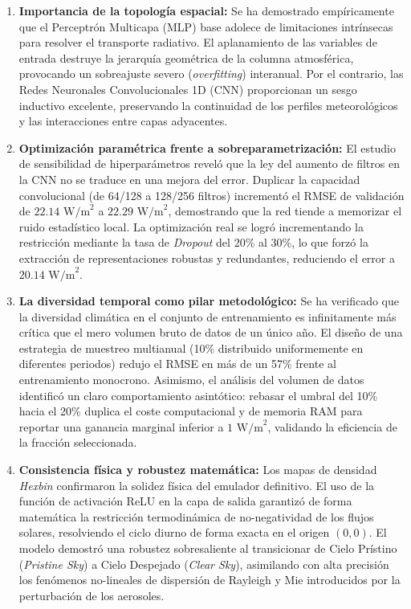 \documentclass[11pt,a4paper,twoside,pdf]{article}
\numberwithin{equation}{section}
\begin{document}
\begin{enumerate}
    \item \textbf{Importancia de la topología espacial:} Se ha demostrado empíricamente que el Perceptrón Multicapa (MLP) base adolece de limitaciones intrínsecas para resolver el transporte radiativo. El aplanamiento de las variables de entrada destruye la jerarquía geométrica de la columna atmosférica, provocando un sobreajuste severo (\textit{overfitting}) interanual. Por el contrario, las Redes Neuronales Convolucionales 1D (CNN) proporcionan un sesgo inductivo excelente, preservando la continuidad de los perfiles meteorológicos y las interacciones entre capas adyacentes.
    
    \item \textbf{Optimización paramétrica frente a sobreparametrización:} El estudio de sensibilidad de hiperparámetros reveló que la ley del aumento de filtros en la CNN no se traduce en una mejora del error. Duplicar la capacidad convolucional (de 64/128 a 128/256 filtros) incrementó el RMSE de validación de $22.14\text{ W/m}^2$ a $22.29\text{ W/m}^2$, demostrando que la red tiende a memorizar el ruido estadístico local. La optimización real se logró incrementando la restricción mediante la tasa de \textit{Dropout} del 20\% al 30\%, lo que forzó la extracción de representaciones robustas y redundantes, reduciendo el error a $20.14\text{ W/m}^2$.
    
    \item \textbf{La diversidad temporal como pilar metodológico:} Se ha verificado que la diversidad climática en el conjunto de entrenamiento es infinitamente más crítica que el mero volumen bruto de datos de un único año. El diseño de una estrategia de muestreo multianual (10\% distribuido uniformemente en diferentes periodos) redujo el RMSE en más de un 57\% frente al entrenamiento monocrono. Asimismo, el análisis del volumen de datos identificó un claro comportamiento asintótico: rebasar el umbral del 10\% hacia el 20\% duplica el coste computacional y de memoria RAM para reportar una ganancia marginal inferior a $1\text{ W/m}^2$, validando la eficiencia de la fracción seleccionada.
    
    \item \textbf{Consistencia física y robustez matemática:} Los mapas de densidad \textit{Hexbin} confirmaron la solidez física del emulador definitivo. El uso de la función de activación ReLU en la capa de salida garantizó de forma matemática la restricción termodinámica de no-negatividad de los flujos solares, resolviendo el ciclo diurno de forma exacta en el origen $(0,0)$. El modelo demostró una robustez sobresaliente al transicionar de Cielo Prístino (\textit{Pristine Sky}) a Cielo Despejado (\textit{Clear Sky}), asimilando con alta precisión los fenómenos no-lineales de dispersión de Rayleigh y Mie introducidos por la perturbación de los aerosoles.
    

\end{enumerate}
\end{document}
